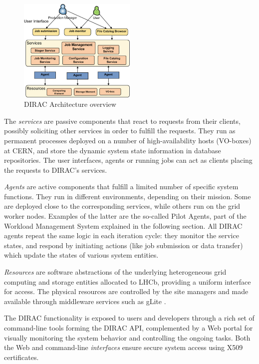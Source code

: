 \documentclass[sort&compress,preprint,3p]{elsarticle}
\begin{document}
\begin{figure}[tp]
\includegraphics[width=0.5\textwidth] {./graphics/Figure1.png}
\centering
\caption{DIRAC Architecture overview}
\label{fig:DIRAC-Arch}
\end{figure}

The \textit{services} are passive components that react to requests from their clients,
possibly soliciting other services in order to fulfill the requests. They run as
permanent processes deployed on a number of high-availability hosts (VO-boxes)
at CERN, and store the dynamic system state information in database
repositories. The user interfaces, agents or running jobs can act as clients
placing the requests to DIRAC's services.

\textit{Agents} are active components that fulfill a limited number of specific system
functions. They run in different environments, depending on their mission.
Some are deployed close to the corresponding services, while others run on the
grid worker nodes. Examples of the latter are the so-called Pilot Agents, part
of the Workload Management System explained in the following section. All DIRAC
agents repeat the same logic in each iteration cycle: they monitor the service states,
 and respond by initiating actions (like job
submission or data transfer) which update the states of various system
entities.

\textit{Resources} are software abstractions of the underlying heterogeneous grid
computing and storage entities allocated to LHCb, providing a uniform interface
for access. The physical resources are controlled by the site managers and made
available through middleware services such as gLite \cite{Laure06programmingthe}.

The DIRAC functionality is exposed to users and developers through a rich set of
command-line tools forming the DIRAC API, complemented by a Web portal for
visually monitoring  the system behavior and controlling the ongoing tasks. Both
the Web and command-line \textit{interfaces} ensure secure system access using X509
certificates. 
\end{document}
